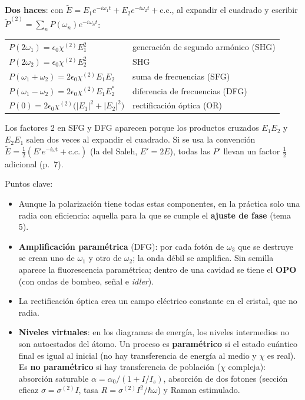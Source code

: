 \documentclass[10pt]{article}
\newcommand{\cc}{\text{c.c.}}
\begin{document}
\textbf{Dos haces}: con $\tilde E=E_1e^{-i\omega_1t}+E_2e^{-i\omega_2t}+\cc$, al expandir el cuadrado y escribir $\tilde P^{(2)}=\sum_n P(\omega_n)e^{-i\omega_nt}$:
\begin{clave}[title={Componentes de la polarización de segundo orden (1.2.7)}]
\renewcommand{\arraystretch}{1.5}
\begin{tabular}{@{}ll@{}}
$P(2\omega_1)=\epsilon_0\chi^{(2)}E_1^2$ & generación de segundo armónico (SHG)\\
$P(2\omega_2)=\epsilon_0\chi^{(2)}E_2^2$ & SHG\\
$P(\omega_1+\omega_2)=2\epsilon_0\chi^{(2)}E_1E_2$ & suma de frecuencias (SFG)\\
$P(\omega_1-\omega_2)=2\epsilon_0\chi^{(2)}E_1E_2^*$ & diferencia de frecuencias (DFG)\\
$P(0)=2\epsilon_0\chi^{(2)}\big(|E_1|^2+|E_2|^2\big)$ & rectificación óptica (OR)
\end{tabular}
\end{clave}
Los factores 2 en SFG y DFG aparecen porque los productos cruzados $E_1E_2$ y $E_2E_1$ salen dos veces al expandir el cuadrado. Si se usa la convención $\tilde E=\frac12(E'e^{-i\omega t}+\cc)$ (la del Saleh, $E'=2E$), todas las $P'$ llevan un factor $\tfrac12$ adicional (p.~7).

Puntos clave:
\begin{itemize}
\item Aunque la polarización tiene todas estas componentes, en la práctica solo una radia con eficiencia: aquella para la que se cumple el \textbf{ajuste de fase} (tema 5).
\item \textbf{Amplificación paramétrica} (DFG): por cada fotón de $\omega_3$ que se destruye se crean uno de $\omega_1$ y otro de $\omega_2$; la onda débil se amplifica. Sin semilla aparece la fluorescencia paramétrica; dentro de una cavidad se tiene el \textbf{OPO} (con ondas de bombeo, señal e \emph{idler}).
\item La rectificación óptica crea un campo eléctrico constante en el cristal, que no radia.
\item \textbf{Niveles virtuales}: en los diagramas de energía, los niveles intermedios no son autoestados del átomo. Un proceso es \textbf{paramétrico} si el estado cuántico final es igual al inicial (no hay transferencia de energía al medio y $\chi$ es real). Es \textbf{no paramétrico} si hay transferencia de población ($\chi$ compleja): absorción saturable $\alpha=\alpha_0/(1+I/I_s)$, absorción de dos fotones (sección eficaz $\sigma=\sigma^{(2)}I$, tasa $R=\sigma^{(2)}I^2/\hbar\omega$) y Raman estimulado.
\end{itemize}
\end{document}
